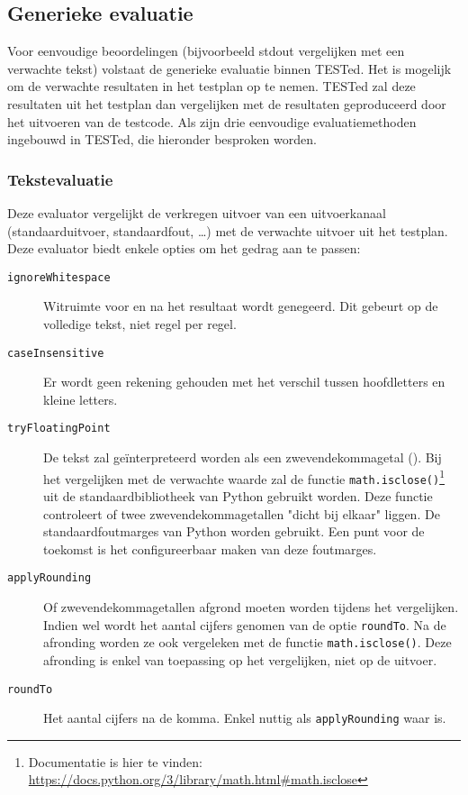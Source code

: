 \subsection{Generieke evaluatie}\label{subsec:ingebouwde-evaluator}

Voor eenvoudige beoordelingen (bijvoorbeeld stdout vergelijken met een verwachte tekst) volstaat de generieke evaluatie binnen TESTed.
Het is mogelijk om de verwachte resultaten in het testplan op te nemen.
TESTed zal deze resultaten uit het testplan dan vergelijken met de resultaten geproduceerd door het uitvoeren van de testcode.
Als  zijn drie eenvoudige evaluatiemethoden ingebouwd in TESTed, die hieronder besproken worden.

\subsubsection{Tekstevaluatie}

Deze evaluator vergelijkt de verkregen uitvoer van een uitvoerkanaal (standaarduitvoer, standaardfout, \ldots) met de verwachte uitvoer uit het testplan.
Deze evaluator biedt enkele opties om het gedrag aan te passen:

\begin{description}
    \item[\texttt{ignoreWhitespace}]
    Witruimte voor en na het resultaat wordt genegeerd.
    Dit gebeurt op de volledige tekst, niet regel per regel.
    \item[\texttt{caseInsensitive}] Er wordt geen rekening gehouden met het verschil tussen hoofdletters en kleine letters.
    \item[\texttt{tryFloatingPoint}]
    De tekst zal geïnterpreteerd worden als een zwevendekommagetal ().
    Bij het vergelijken met de verwachte waarde zal de functie \texttt{math.isclose()}\footnote{Documentatie is hier te vinden: \url{https://docs.python.org/3/library/math.html\#math.isclose}} uit de standaardbibliotheek van Python gebruikt worden.
    Deze functie controleert of twee zwevendekommagetallen "dicht bij elkaar" liggen.
    De standaardfoutmarges van Python worden gebruikt.
    Een punt voor de toekomst is het configureerbaar maken van deze foutmarges.
    \item[\texttt{applyRounding}] Of zwevendekommagetallen afgrond moeten worden tijdens het vergelijken.
    Indien wel wordt het aantal cijfers genomen van de optie \texttt{roundTo}.
    Na de afronding worden ze ook vergeleken met de functie \texttt{math.isclose()}.
    Deze afronding is enkel van toepassing op het vergelijken, niet op de uitvoer.
    \item[\texttt{roundTo}] Het aantal cijfers na de komma.
    Enkel nuttig als \texttt{applyRounding} waar is.
\end{description}

